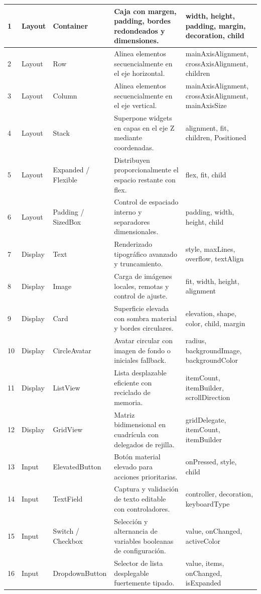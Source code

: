 \documentclass[12pt,a4paper]{article}
\begin{document}
\begin{small}
\begin{longtable}{|p{0.8cm}|p{2.2cm}|p{2.3cm}|p{5.5cm}|p{3.5cm}|}
1 & Layout & Container & Caja con margen, padding, bordes redondeados y dimensiones. & width, height, padding, margin, decoration, child \\ \hline
2 & Layout & Row & Alinea elementos secuencialmente en el eje horizontal. & mainAxisAlignment, crossAxisAlignment, children \\ \hline
3 & Layout & Column & Alinea elementos secuencialmente en el eje vertical. & mainAxisAlignment, crossAxisAlignment, mainAxisSize \\ \hline
4 & Layout & Stack & Superpone widgets en capas en el eje Z mediante coordenadas. & alignment, fit, children, Positioned \\ \hline
5 & Layout & Expanded / Flexible & Distribuyen proporcionalmente el espacio restante con flex. & flex, fit, child \\ \hline
6 & Layout & Padding / SizedBox & Control de espaciado interno y separadores dimensionales. & padding, width, height, child \\ \hline
7 & Display & Text & Renderizado tipográfico avanzado y truncamiento. & style, maxLines, overflow, textAlign \\ \hline
8 & Display & Image & Carga de imágenes locales, remotas y control de ajuste. & fit, width, height, alignment \\ \hline
9 & Display & Card & Superficie elevada con sombra material y bordes circulares. & elevation, shape, color, child, margin \\ \hline
10 & Display & CircleAvatar & Avatar circular con imagen de fondo o iniciales fallback. & radius, backgroundImage, backgroundColor \\ \hline
11 & Display & ListView & Lista desplazable eficiente con reciclado de memoria. & itemCount, itemBuilder, scrollDirection \\ \hline
12 & Display & GridView & Matriz bidimensional en cuadrícula con delegados de rejilla. & gridDelegate, itemCount, itemBuilder \\ \hline
13 & Input & ElevatedButton & Botón material elevado para acciones prioritarias. & onPressed, style, child \\ \hline
14 & Input & TextField & Captura y validación de texto editable con controladores. & controller, decoration, keyboardType \\ \hline
15 & Input & Switch / Checkbox & Selección y alternancia de variables booleanas de configuración. & value, onChanged, activeColor \\ \hline
16 & Input & DropdownButton & Selector de lista desplegable fuertemente tipado. & value, items, onChanged, isExpanded \\ \hline

\end{longtable}
\end{small}
\end{document}
